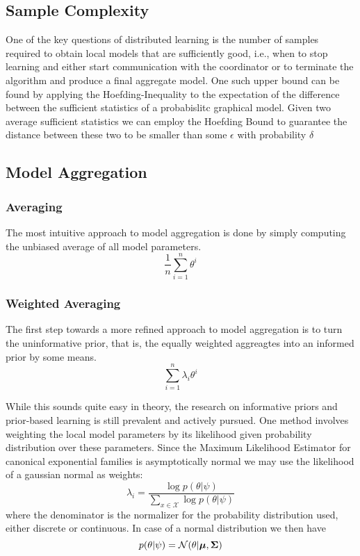 \subsection{Sample Complexity}
One of the key questions of distributed learning is the number of samples required to obtain local models that are sufficiently good, i.e., when to stop learning and either start communication with the coordinator
or to terminate the algorithm and produce a final aggregate model. 
One such upper bound can be found by applying the Hoefding-Inequality to the expectation of the difference between the sufficient statistics of a probabislitc graphical model.
Given two average sufficient statistics we can employ the Hoefding Bound to guarantee the distance between these two to be smaller than some $\epsilon$ with probability $\delta$

\subsection{Model Aggregation}

\subsubsection{Averaging}
The most intuitive approach to model aggregation is done by simply computing the unbiased average of all model parameters.
\begin{equation}
    \frac{1}{n} \sum_{i=1}^n \theta^i
\end{equation}
\subsubsection{Weighted Averaging}
The first step towards a more refined approach to model aggregation is to turn the uninformative prior, that is, the equally weighted aggreagtes into an informed prior by some means.
\begin{equation}
     \sum_{i=1}^n \lambda_i \theta^i
\end{equation}

While this sounds quite easy in theory, the research on informative priors and prior-based learning is still prevalent and actively pursued.
One method involves weighting the local model parameters by its likelihood given probability distribution over these parameters.
Since the Maximum Likelihood Estimator for canonical exponential families is asymptotically normal we may use the likelihood of a gaussian normal as weights:
\begin{equation}
    \lambda_i = \frac{\log p(\theta \lvert \psi)}{\sum_{x\in \mathcal{X}} \log p(\theta \lvert \psi)}
\end{equation}
where the denominator is the normalizer for the probability distribution used, either discrete or continuous.
In case of a normal distribution we then have
\begin{equation}
    p(\theta \lvert \psi) = \mathcal{N}(\theta \lvert \boldsymbol{\mu}, \boldsymbol{\Sigma})
\end{equation}

